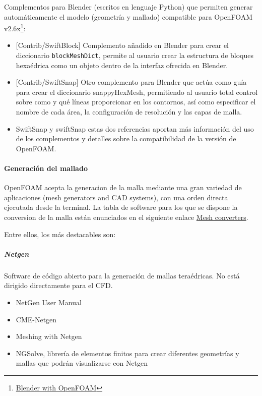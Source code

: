 Complementos para Blender (escritos en lenguaje Python) que permiten
generar automáticamente el modelo (geometría y mallado) compatible para
OpenFOAM v2.6x\footnote{\href{https://openfoamwiki.net/index.php/Blender}{Blender with OpenFOAM}}:

\begin{itemize}
\item
  {[}Contrib/SwiftBlock{]} Complemento añadido en Blender para crear el
  diccionario \texttt{blockMeshDict}, permite al usuario crear la
  estructura de bloques hexaédrica como un objeto dentro de la interfaz
  ofrecida en Blender.
\item
  {[}Contrib/SwiftSnap{]} Otro complemento para Blender que actúa como
  guía para crear el diccionario snappyHexMesh, permitiendo al usuario
  total control sobre como y qué líneas proporcionar en los contornos,
  así como especificar el nombre de cada área, la configuración de
  resolución y las capas de malla.
\item
  SwiftSnap\cite{cfd-online} y
  swiftSnap\cite{swiftSnap} estas dos referencias aportan más información del
  uso de los complementos y detalles sobre la compatibilidad de la
  versión de OpenFOAM.
\end{itemize}

\paragraph{Generación del mallado}\label{header-n181}

OpenFOAM acepta la generacion de la malla mediante una gran variedad de
aplicaciones (mesh generators and CAD systems), con una orden directa
ejecutada desde la terminal. La tabla de software para los que se
dispone la conversion de la malla están enunciados en el siguiente
enlace \href{http://www.openfoam.org/features/mesh-conversion.php}{Mesh converters}.



Entre ellos, los más destacables son:

\subparagraph{Netgen\cite{Netgen}}\label{header-n190}

Software de código abierto para la generación de mallas teraédricas. No
está dirigido directamente para el CFD.

\begin{itemize}
\item
  NetGen User Manual\cite{netgen_usermanual}
\item
  CME-Netgen\cite{Netgen}
\item
  Meshing with Netgen\cite{Meshing_with_Netgen}
\item
  NGSolve, librería de elementos finitos para crear diferentes
  geometrías y mallas que podrán visualizarse con Netgen\cite{NETGEN_NGSolve}
\end{itemize}


